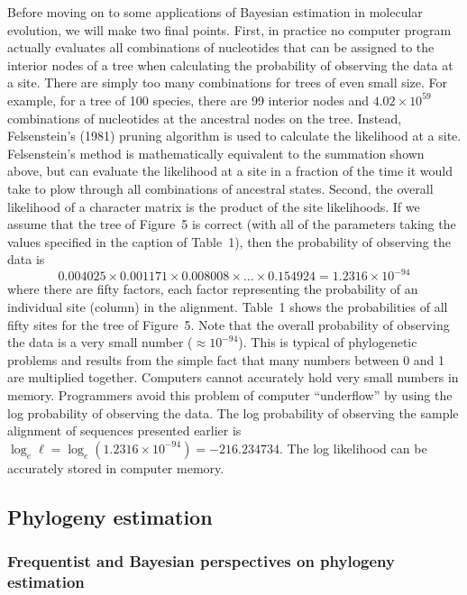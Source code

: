 \documentclass{svmult}
\begin{document}
Before moving on to some applications of Bayesian estimation in molecular evolution, we will make
two final points. First, in practice no computer program actually evaluates all combinations of
nucleotides that can be assigned to the interior nodes of a tree when calculating the probability
of observing the data at a site. There are simply too many combinations for trees of even small
size. For example, for a tree of 100 species, there are 99 interior nodes and $4.02 \times 10^{59}$
combinations of nucleotides at the ancestral nodes on the tree. Instead, Felsenstein's (1981)
pruning algorithm is used to calculate the likelihood at a site. Felsenstein's method is
mathematically equivalent to the summation shown above, but can evaluate the likelihood at a site
in a fraction of the time it would take to plow through all combinations of ancestral states.
Second, the overall likelihood of a character matrix is the product of the site likelihoods. If we
assume that the tree of Figure~5 is correct (with all of the parameters taking the values specified
in the caption of Table~1), then the probability of observing the data is
$$
0.004025 \times 0.001171 \times 0.008008 \times \ldots \times  0.154924 = 1.2316 \times 10^{-94}
$$
where there are fifty factors, each factor representing the probability of an individual site
(column) in the alignment. Table~1 shows the probabilities of all fifty sites for the tree of
Figure~5. Note that the overall probability of observing the data is a very small number ($\approx
10^{-94}$). This is typical of phylogenetic problems and results from the simple fact that many
numbers between 0 and 1 are multiplied together. Computers cannot accurately hold very small
numbers in memory. Programmers avoid this problem of computer ``underflow'' by using the log
probability of observing the data. The log probability of observing the sample alignment of
sequences presented earlier is  $\log_e \ell = \log_e(1.2316 \times 10^{-94}) = -216.234734$. The
log likelihood can be accurately stored in computer memory.

\subsection{Phylogeny estimation}

\subsubsection{Frequentist and Bayesian perspectives on phylogeny estimation}
\end{document}
